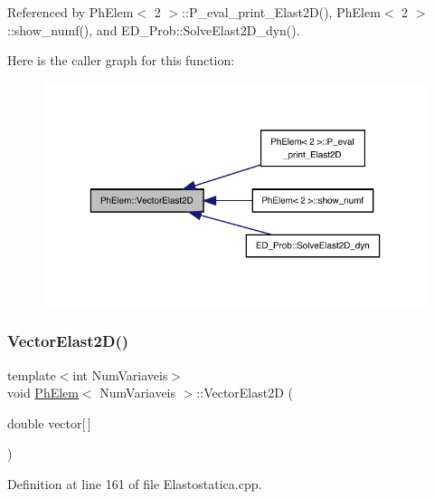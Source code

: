 Referenced by Ph\+Elem$<$ 2 $>$\+::\+P\+\_\+eval\+\_\+print\+\_\+\+Elast2\+D(), Ph\+Elem$<$ 2 $>$\+::show\+\_\+numf(), and E\+D\+\_\+\+Prob\+::\+Solve\+Elast2\+D\+\_\+dyn().

Here is the caller graph for this function\+:
\nopagebreak
\begin{figure}[H]
\begin{center}
\leavevmode
\includegraphics[width=323pt]{classPhElem_a38499c9f62a291a880d72db646171cb5_icgraph}
\end{center}
\end{figure}
\mbox{\label{classPhElem_a4b130cb327652894d81b2c4e26b96f41}} 
\subsubsection{\texorpdfstring{Vector\+Elast2\+D()}{VectorElast2D()}\hspace{0.1cm}{\footnotesize\ttfamily [2/2]}}
{\footnotesize\ttfamily template$<$int Num\+Variaveis$>$ \\
void \hyperlink{classPhElem}{Ph\+Elem}$<$ Num\+Variaveis $>$\+::Vector\+Elast2D (\begin{DoxyParamCaption}\item[{double}]{vector\mbox{[}$\,$\mbox{]} }\end{DoxyParamCaption})}



Definition at line 161 of file Elastostatica.\+cpp.

\mbox{\label{classPhElem_a993d5f1b66f6d99ffb95adc9ff882e80}} 

